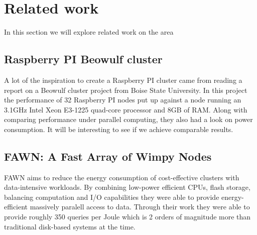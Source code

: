 \clearpage
\section{Related work}
In this section we will explore related work on the area
\subsection{Raspberry PI Beowulf cluster}
A lot of the inspiration to create a Raspberry PI cluster came from reading a report on a Beowulf cluster project from Boise State University.\cite{RPI_BEOWULF} In this project the performance of 32 Raspberry PI nodes put up against a node running an 3.1GHz Intel Xeon E3-1225 quad-core processor and 8GB of RAM. Along with comparing performance under parallel computing, they also had a look on power consumption. It will be interesting to see if we achieve comparable results. 

\subsection{FAWN: A Fast Array of Wimpy Nodes}
FAWN\cite{fawn} aims to reduce the energy consumption of cost-effective clusters with data-intensive workloads. By combining low-power efficient CPUs, flash storage, balancing computation and I/O capabilities they were able to provide energy-efficient massively paralell access to data. Through their work they were able to provide roughly 350 queries per Joule which is 2 orders of magnitude more than traditional disk-based systems at the time. 

